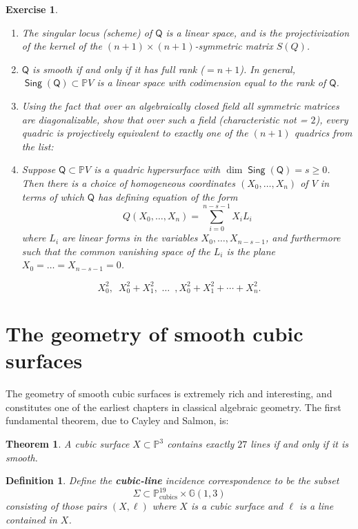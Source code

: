 \documentclass[11pt]{article}
\renewcommand{\P}{\mathbb{P}}
\newcommand{\G}{\mathbb{G}}
\DeclareMathOperator{\sing}{\mathsf{Sing}}
\DeclareMathOperator{\cubics}{\textrm{cubics}}
\renewcommand{\P}{\mathbb P}
\newcommand{\G}{\mathbb G}
\newtheorem{theorem}{Theorem}[section]
\newtheorem{definition}{Definition}[section]
\newtheorem{exercise}{Exercise}[section]
\begin{document}
\begin{exercise}
\begin{enumerate}
\item The singular locus (scheme) of \(\mathsf{Q}\) is a linear space, and is the projectivization of the kernel of the \((n+1)\times(n+1)\)-symmetric matrix \(S(Q)\).

\item \(\mathsf{Q}\) is smooth if and only if it has full rank (\(= n+1\)). In general, \(\sing(\mathsf{Q}) \subset \P V\) is a linear space with codimension equal to the rank of \(\mathsf{Q}\).

\item Using the fact that over an algebraically closed field all  symmetric matrices are diagonalizable, show that over such a field (characteristic not = \(2\)), every quadric is projectively equivalent to exactly one of the \((n+1)\) quadrics from the list:
\item Suppose \(\mathsf{Q} \subset \P V\) is a quadric hypersurface with \(\dim \sing(\mathsf{Q}) = s \geq 0\).  Then there is a choice of homogeneous coordinates \((X_0, \dots, X_{n})\) of \(V\) in terms of which \(\mathsf{Q}\) has defining equation of the form $$Q(X_0, \ldots, X_n) = \sum_{i = 0}^{n-s-1}X_{i}L_{i}$$ where \(L_{i}\) are linear forms in the variables \(X_0, \ldots, X_{n-s-1}\), and furthermore such that the common vanishing space of the \(L_{i}\) is the plane \(X_0 = \dots = X_{n-s-1}=0\).
\end{enumerate}
\[X_{0}^{2},\,\,\, X_{0}^2+X_{1}^2,\,\, \ldots\,\,\,, X_{0}^{2} + X_{1}^2 + \cdots +X_{n}^{2}.\]
\end{exercise}
\section{The geometry of smooth cubic surfaces}
\label{sec:org4b4bdbb}
The geometry of smooth cubic surfaces is extremely rich and interesting, and constitutes one of the earliest chapters  in classical algebraic geometry.  The first fundamental theorem, due to Cayley and Salmon, is: 

\begin{theorem}
A cubic surface \(X \subset \P^3\) contains exactly \(27\) lines if and only if it is smooth. 
\end{theorem}


\begin{definition}
Define the \textbf{\emph{cubic-line}} incidence correspondence to be the subset \[\Sigma \subset \P^{19}_{\cubics} \times \G(1,3)\] consisting of those pairs \((X,\ell)\) where \(X\) is a cubic surface and \(\ell\) is a line contained in \(X\).
\end{definition}
\end{document}

